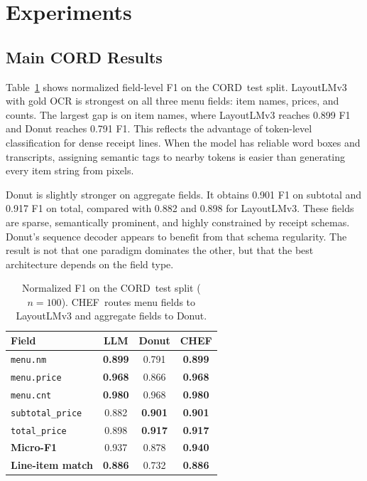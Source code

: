 \documentclass[9pt,twocolumn,twoside]{extarticle}
\newcommand{\cord}{\textsc{CORD}}
\newcommand{\chef}{\textsc{CHEF}}
\begin{document}
\section{Experiments}
\label{sec:experiments}

\subsection{Main CORD Results}
\label{sec:main-results}

Table~\ref{tab:main-results} shows normalized field-level F1 on the \cord\ test split. LayoutLMv3 with gold OCR is strongest on all three menu fields: item names, prices, and counts. The largest gap is on item names, where LayoutLMv3 reaches 0.899 F1 and Donut reaches 0.791 F1. This reflects the advantage of token-level classification for dense receipt lines. When the model has reliable word boxes and transcripts, assigning semantic tags to nearby tokens is easier than generating every item string from pixels.

Donut is slightly stronger on aggregate fields. It obtains 0.901 F1 on subtotal and 0.917 F1 on total, compared with 0.882 and 0.898 for LayoutLMv3. These fields are sparse, semantically prominent, and highly constrained by receipt schemas. Donut's sequence decoder appears to benefit from that schema regularity. The result is not that one paradigm dominates the other, but that the best architecture depends on the field type.

\begin{table}[t]
\centering
\caption{Normalized F1 on the \cord\ test split ($n=100$). \chef\ routes menu fields to LayoutLMv3 and aggregate fields to Donut.}
\label{tab:main-results}
\scriptsize
\begin{tabular}{@{}lccc@{}}
\toprule
\textbf{Field} & \textbf{LLM} & \textbf{Donut} & \textbf{\chef} \\
\midrule
\texttt{menu.nm} & \textbf{0.899} & 0.791 & \textbf{0.899} \\
\texttt{menu.price} & \textbf{0.968} & 0.866 & \textbf{0.968} \\
\texttt{menu.cnt} & \textbf{0.980} & 0.968 & \textbf{0.980} \\
\texttt{subtotal\_price} & 0.882 & \textbf{0.901} & \textbf{0.901} \\
\texttt{total\_price} & 0.898 & \textbf{0.917} & \textbf{0.917} \\
\midrule
\textbf{Micro-F1} & 0.937 & 0.878 & \textbf{0.940} \\
\textbf{Line-item match} & \textbf{0.886} & 0.732 & \textbf{0.886} \\
\bottomrule
\end{tabular}
\end{table}
\end{document}
